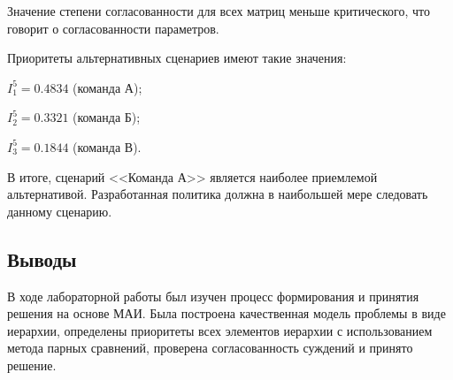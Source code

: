 Значение степени согласованности для всех матриц меньше критического, что говорит о согласованности параметров.

Приоритеты альтернативных сценариев имеют такие значения:
\begin{description}
	\item $I^5_1=0.4834$ (команда А);
	\item $I^5_2=0.3321$ (команда Б);
	\item $I^5_3=0.1844$ (команда В).
\end{description}

В итоге, сценарий <<Команда А>> является наиболее приемлемой альтернативой. Разработанная политика должна в наибольшей мере следовать данному сценарию.

\subsection{Выводы}

В ходе лабораторной работы был изучен процесс формирования и принятия решения на основе МАИ. Была построена качественная модель проблемы в виде иерархии, определены приоритеты всех элементов иерархии с использованием метода парных сравнений, проверена согласованность суждений и принято решение.


